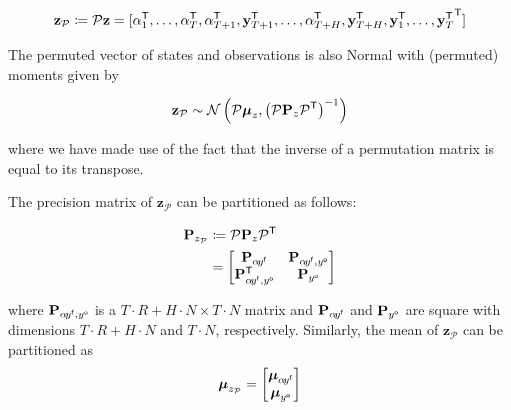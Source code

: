 \documentclass[notitlepage,a4paper,12pt]{article}
\newcommand{\transpose}[1]{{#1}^{\sf{T}}}
\begin{document}
$$
\mathbf{z_{\mathcal{P}}} \coloneqq \mathcal{P} \mathbf{z} =
 \transpose{[
     \alpha^{\sf{T}}_1, 
     \dots, 
     \alpha^{\sf{T}}_T, 
     \alpha^{\sf{T}}_{T+1}, 
     \mathbf{y}^{\sf{T}}_{T+1}, 
     \dots, 
     \alpha^{\sf{T}}_{T+H}, 
     \mathbf{y}^{\sf{T}}_{T+H},
     \mathbf{y}^{\sf{T}}_1,
     \dots,
     \mathbf{y}^{\sf{T}}_T}]
$$

The permuted vector of states and observations is also Normal with (permuted) moments given by 

\begin{equation*}
    \mathbf{z_{\mathcal{P}}} \sim \mathcal{N}\left(\mathcal{P}\boldsymbol{\mu}_z, \left(\mathcal{P} \mathbf{P}_z \transpose{\mathcal{P}}\right)^{-1}\right)
\end{equation*}

where we have made use of the fact that the inverse of a permutation matrix is equal to its transpose. 

The precision matrix of $\mathbf{z}_{\mathcal{P}}$ can be partitioned as follows: 

\begin{align*}
    \mathbf{P}_{z_{\mathcal{P}}} &\coloneqq  \mathcal{P} \mathbf{P}_z \transpose{\mathcal{P}} \\
    &= 
    \begin{bmatrix}
        \mathbf{P}_{\alpha\! y^{\sf{f}}} & \mathbf{P}_{\alpha\! y^{\sf{f}}, y^{\sf{o}}} \\ 
        \mathbf{P}^{\sf{T}}_{\alpha\! y^{\sf{f}}, y^{\sf{o}}} & \mathbf{P}_{y^{\sf{o}}}
    \end{bmatrix}
\end{align*}


where $\mathbf{P}_{\alpha\! y^{\sf{f}}, y^{\sf{o}}}$ is a 
$T\!\cdot\!R + H\!\cdot\!N \times T\!\cdot\!N$ matrix and $\mathbf{P}_{\alpha\! y^{\sf{f}}}$ and $\mathbf{P}_{y^{\sf{o}}}$ are square with dimensions $T\!\cdot\!R + H\!\cdot\!N$ and $T\!\cdot\!N $, respectively. Similarly, the mean of $\mathbf{z}_{\mathcal{P}}$ can be partitioned as 
$$
\boldsymbol{\mu}_{z_{\mathcal{P}}} = 
\begin{bmatrix}
    \boldsymbol{\mu}_{\alpha\! y^{\sf{f}}} \\
    \boldsymbol{\mu}_{y^{\sf{o}}}
\end{bmatrix}
$$
\end{document}
